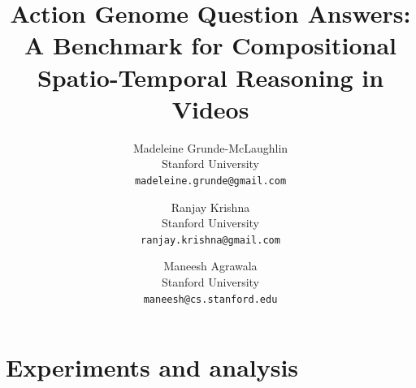 \documentclass[10pt,twocolumn,letterpaper]{article}
\begin{document}
\title{Action Genome Question Answers: \\ A Benchmark for Compositional Spatio-Temporal Reasoning in Videos}

\author{Madeleine Grunde-McLaughlin\\
Stanford University\\
{\tt\small madeleine.grunde@gmail.com}

\and
Ranjay Krishna\\
Stanford University\\
{\tt\small ranjay.krishna@gmail.com}

\and
Maneesh Agrawala\\
Stanford University\\
{\tt\small maneesh@cs.stanford.edu}


}
\maketitle
\pagestyle{empty}

\begin{abstract}

\end{abstract}







\section{Experiments and analysis}

\end{document}
